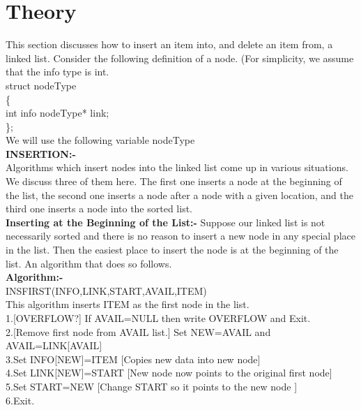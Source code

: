 \documentclass[11pt]{article}            %
\begin{document}
\section{Theory }        
This section discusses how to insert an item into, and delete an item from, a linked list.
Consider the following definition of a node. (For simplicity, we assume that the info type is int.\\
struct nodeType\\
\{\\
int info nodeType* link;\\
\};\\
We will use the following variable nodeType\\
\textbf{INSERTION:- }\\ 
Algorithms which insert nodes into the linked list come up in various situations. We discuss
three of them here. The first one inserts a node at the beginning of the list, the second one inserts
a node after a node with a given location, and the third one inserts a node into the sorted list.\\
\textbf{Inserting at the Beginning of the List:-}
Suppose our linked list is not necessarily sorted and there is no reason to insert a new node
in any special place in the list. Then the easiest place to insert the node is at the beginning of
the list. An algorithm that does so follows.\\

\textbf{Algorithm:- }\\
INSFIRST(INFO,LINK,START,AVAIL,ITEM)\\
This algorithm inserts ITEM as the first node in the list.\\
1.[OVERFLOW?] If AVAIL=NULL then write OVERFLOW and Exit.\\
2.[Remove first node from AVAIL list.] Set NEW=AVAIL
and AVAIL=LINK[AVAIL]\\
3.Set INFO[NEW]=ITEM [Copies new data into new node]\\
4.Set LINK[NEW]=START [New node now points to the original first node]\\
5.Set START=NEW [Change START so it points to the new node ]\\
6.Exit.\\
\end{document}
